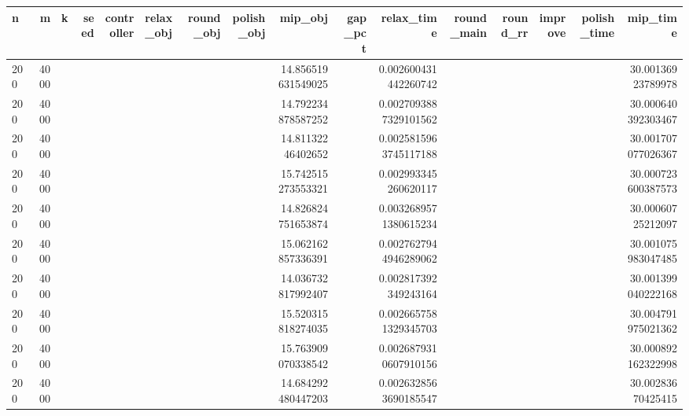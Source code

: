 \begin{tabular}{lrrrrlrrrrrrrrrr}
\hline
n & m & k & seed & controller & relax_obj & round_obj & polish_obj & mip_obj & gap_pct & relax_time & round_main & round_rr & improve & polish_time & mip_time \\ \hline
200 & 4000 &  &  &  &  &  &  & 14.856519631549025 &  & 0.002600431442260742 &  &  &  &  & 30.00136923789978 \\
200 & 4000 &  &  &  &  &  &  & 14.792234878587252 &  & 0.0027093887329101562 &  &  &  &  & 30.000640392303467 \\
200 & 4000 &  &  &  &  &  &  & 14.81132246402652 &  & 0.0025815963745117188 &  &  &  &  & 30.001707077026367 \\
200 & 4000 &  &  &  &  &  &  & 15.742515273553321 &  & 0.002993345260620117 &  &  &  &  & 30.000723600387573 \\
200 & 4000 &  &  &  &  &  &  & 14.826824751653874 &  & 0.0032689571380615234 &  &  &  &  & 30.00060725212097 \\
200 & 4000 &  &  &  &  &  &  & 15.062162857336391 &  & 0.0027627944946289062 &  &  &  &  & 30.001075983047485 \\
200 & 4000 &  &  &  &  &  &  & 14.036732817992407 &  & 0.002817392349243164 &  &  &  &  & 30.001399040222168 \\
200 & 4000 &  &  &  &  &  &  & 15.520315818274035 &  & 0.0026657581329345703 &  &  &  &  & 30.004791975021362 \\
200 & 4000 &  &  &  &  &  &  & 15.763909070338542 &  & 0.0026879310607910156 &  &  &  &  & 30.000892162322998 \\
200 & 4000 &  &  &  &  &  &  & 14.684292480447203 &  & 0.0026328563690185547 &  &  &  &  & 30.00283670425415 \\
\hline
\end{tabular}
